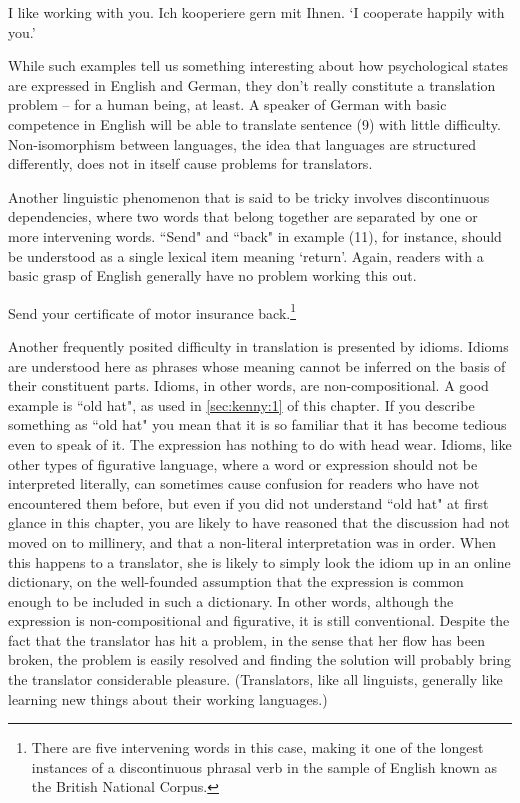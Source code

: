 \documentclass[output=paper]{langscibook}
\begin{document}
\ea I like working with you.
\ex Ich kooperiere gern mit Ihnen.
\glt ‘I cooperate happily with you.'
\z

While such examples tell us something interesting about how psychological states are expressed in English and German, they don't really constitute a translation problem -- for a human being, at least. A speaker of German with basic competence in English will be able to translate sentence (9) with little difficulty. Non-isomorphism between languages, the idea that languages are structured differently, does not in itself cause problems for translators.

Another linguistic phenomenon that is said to be tricky involves discontinuous dependencies, where two words that belong together are separated by one or more intervening words. “Send" and “back" in example (11), for instance, should be understood as a single lexical item meaning ‘return'. Again, readers with a basic grasp of English generally have no problem working this out.

\ea
Send your certificate of motor insurance back.\footnote{There are five intervening words in this case, making it one of the longest instances of a discontinuous phrasal verb in the sample of English known as the British National Corpus.}
\z

Another frequently posited difficulty in translation is presented by idioms. Idioms are understood here as phrases whose meaning cannot be inferred on the basis of their constituent parts. Idioms, in other words, are non-compositional. A good example is “old hat", as used in \ref{sec:kenny:1} of this chapter. If you describe something as “old hat" you mean that it is so familiar that it has become tedious even to speak of it. The expression has nothing to do with head wear. Idioms, like other types of figurative language, where a word or expression should not be interpreted literally, can sometimes cause confusion for readers who have not encountered them before, but even if you did not understand “old hat" at first glance in this chapter, you are likely to have reasoned that the discussion had not moved on to millinery, and that a non-literal interpretation was in order. When this happens to a translator, she is likely to simply look the idiom up in an online dictionary, on the well-founded assumption that the expression is common enough to be included in such a dictionary. In other words, although the expression is non-compositional and figurative, it is still conventional. Despite the fact that the translator has hit a problem, in the sense that her flow has been broken, the problem is easily resolved and finding the solution will probably bring the translator considerable pleasure. (Translators, like all linguists, generally like learning new things about their working languages.) 
\end{document}
